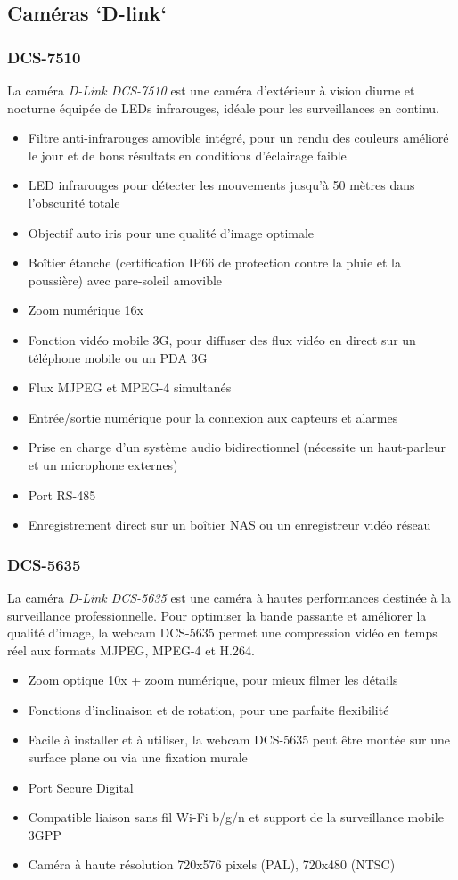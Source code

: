 \subsection{Caméras `D-link`}
\subsubsection{DCS-7510}
La caméra \textit{D-Link DCS-7510} est une caméra d'extérieur à vision diurne et
nocturne équipée de LEDs infrarouges, idéale pour les surveillances en continu.
\begin{itemize}
  \item Filtre anti-infrarouges amovible intégré, pour un rendu des couleurs amélioré
  le jour et de bons résultats en conditions d'éclairage faible
  \item LED infrarouges
  pour détecter les mouvements jusqu'à 50 mètres dans l'obscurité totale
  \item Objectif auto iris pour une qualité d’image optimale
  \item Boîtier étanche (certification IP66 de protection contre la pluie et la
  poussière) avec pare-soleil amovible
  \item Zoom numérique 16x
  \item Fonction vidéo mobile 3G, pour diffuser des flux vidéo en direct sur un
  téléphone mobile ou un PDA 3G
  \item Flux MJPEG et MPEG-4 simultanés
  \item Entrée/sortie numérique pour la connexion aux capteurs et alarmes
  \item Prise en charge d'un système audio bidirectionnel (nécessite un haut-parleur
  et un microphone externes)
  \item Port RS-485
  \item Enregistrement direct sur un boîtier NAS ou un enregistreur vidéo réseau
\end{itemize}
\subsubsection{DCS-5635}
La caméra \textit{D-Link DCS-5635} est une caméra à hautes performances destinée
à la surveillance professionnelle.
Pour optimiser la bande passante et améliorer la qualité d'image, la webcam
DCS-5635 permet une compression vidéo en temps réel aux formats MJPEG, MPEG-4 et
H.264.
\begin{itemize}
  \item Zoom optique 10x + zoom numérique, pour mieux filmer les détails
  \item Fonctions d'inclinaison et de rotation, pour une parfaite flexibilité
  \item Facile à installer et à utiliser, la webcam DCS-5635 peut être montée sur une surface plane ou via une fixation murale
  \item Port Secure Digital
  \item Compatible liaison sans fil Wi-Fi b/g/n et support de la surveillance mobile 3GPP
  \item Caméra à haute résolution 720x576 pixels (PAL), 720x480 (NTSC)
\end{itemize}
